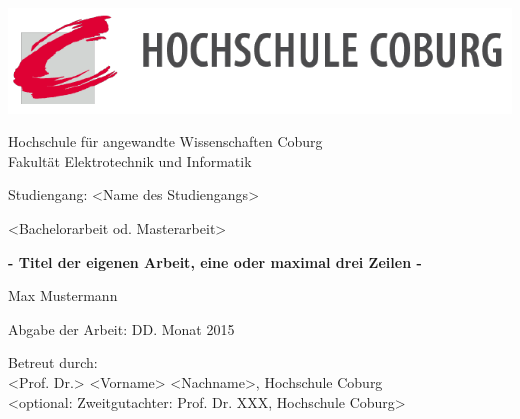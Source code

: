 \begin{titlepage}
    \begin{center}
    \includegraphics[width=\textwidth]{Images/logo}
        \begin{Large}
        Hochschule für angewandte Wissenschaften Coburg
        \\
        Fakultät Elektrotechnik und Informatik
        \par
        \end{Large}
        \vspace{2.0cm}
        
        \begin{Large}
            Studiengang: <Name des Studiengangs>
            \par
        \end{Large}
        \vspace{1.5cm}
        
        {\Large
            <Bachelorarbeit od. Masterarbeit>
        }
        \vspace{2.0cm}

        \begin{huge}
            \textbf{- Titel der eigenen Arbeit, eine oder maximal drei Zeilen -} 
            \par
        \end{huge}        
        \vfill
        
        \begin{huge}
            Max Mustermann
        \end{huge}
        \vspace{2.0cm}
        
        \begin{large}
            Abgabe der Arbeit: DD. Monat 2015
            
            Betreut durch:
            \\
            <Prof. Dr.> <Vorname> <Nachname>, Hochschule Coburg
            \\
            <optional: Zweitgutachter: Prof. Dr. XXX, Hochschule Coburg>
            \par
        \end{large}
        
    \end{center}
\end{titlepage}
\restoregeometry